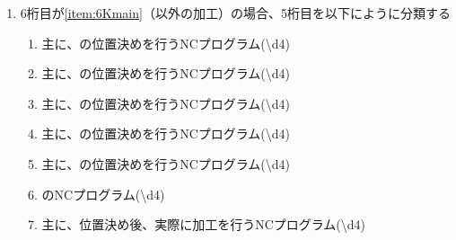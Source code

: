 \begin{enumerate}[label=\alph*)]
\item 6桁目が\ref{item:6Kmain}（\Dimple 以外の加工）の場合、5桁目を以下にように分類する
  \begin{enumerate}[label=\arabic*., ref=\arabic*, start=1]
  \item%
    主に、\EndFacecutMilling の位置決めを行うNCプログラム({\textbackslash d{4}})
  \item\label{item:5KO} 主に、\OutcutMilling の位置決めを行うNCプログラム({\textbackslash d{4}})
  \item%
    主に、\KeywayMilling の位置決めを行うNCプログラム({\textbackslash d{4}})
  \item%
    主に、\EndFaceOutCChamferMilling の位置決めを行うNCプログラム({\textbackslash d{4}})
  \item%
    主に、\EndFaceInCChamferMilling の位置決めを行うNCプログラム({\textbackslash d{4}})
  \item%
    \EndFaceBoringMilling のNCプログラム({\textbackslash d{4}})
  \setcounter{enumii}{8}
  \item 主に、位置決め後、実際に加工を行うNCプログラム({\textbackslash d{4}})
  \end{enumerate}
\end{enumerate}


